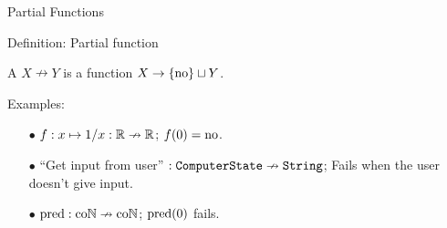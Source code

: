 \begin{frame}{Partial Functions}
  
  \begin{block}{Definition: Partial function}

    \par A  $X \nrightarrow Y$ is a function $X \to \{\mathrm{no}\} \sqcup Y$.

  \end{block}

  \par Examples:\pause
  \begin{itemize}
    \item[$\bullet$] {
      $f : x \mapsto 1 / x : \mathbb{R} \nrightarrow \mathbb{R}$;
      \newline
      $f(0) = \mathrm{no}$.
      \newline
    }\pause
    \item[$\bullet$] {
      ``Get input from user'' $: \texttt{ComputerState} \nrightarrow \texttt{String}$;
      \newline
      Fails when the user doesn't give input.
      \newline
    }\pause
    \item[$\bullet$] {
      $\operatorname{pred} : \mathrm{co}\mathbb{N} \nrightarrow \mathrm{co}\mathbb{N}$;
      \newline
      $\operatorname{pred}(0)$ fails.
    }
  \end{itemize}

\end{frame}

\begin{frame}{}

\end{frame}
